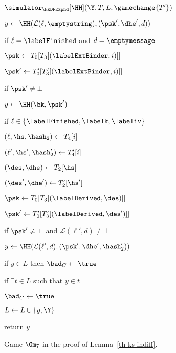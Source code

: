 \begin{figure}[tp]
\begin{minipage}[t]{0.49\textwidth}
\begin{oracle}{$\simulator_{\HKDFExpnd}[\HH](\Y, T, L, \gamechange{T'})$}
			\item \quad \quad $y \gets \HH(\mathcal{L} (\ell,\emptystring),(\psk', \dhe', d))$ 
			\item \quad \quad {}
			\item \quad \quad \quad {}
			\item
			\item if $\ell = \labelFinished$ and $d = \emptymessage$ 
			\item \quad $\psk \gets T_0[T_3[(\labelExtBinder, i)]]$
			\item \quad $\psk' \gets T'_0[T'_3[(\labelExtBinder, i)]]$
			\item \quad if $\psk' \neq \bot$ 
			\item \quad \quad $y \gets \HH(\bk, \psk')$
			\item \quad \quad {}
			\item \quad \quad \quad {}
			\item 
			\item if $\ell \in \{\labelFinished, \labelk, \labeliv \}$
			\item \quad $(\ell, \hs, \hash_2) \gets T_4[i]$
			\item \quad $(\ell', \hs', \hash'_2) \gets T'_4[i]$
			\item \quad $(\des, \dhe) \gets T_2[\hs]$
			\item \quad $(\des', \dhe') \gets T'_2[\hs']$
			\item \quad $\psk \gets T_0[T_3[(\labelDerived, \des)]]$
			\item \quad $\psk' \gets T'_0[T'_3[(\labelDerived, \des')]]$
			\item \quad if $\psk' \neq \bot$ and $\mathcal{L}(\ell', d) \neq \bot$ 
			\item \quad \quad $y \gets \HH(\mathcal{L} (\ell', d), (\psk', \dhe',\hash'_2))$
			\item \quad \quad {}
			\item \quad \quad \quad {}
			\item if $y \in L$ then $\bad_C \gets \true$
			\item if $\exists t \in L$ such that $y \in t$
			\item \quad $\bad_C \gets \true$
			\item $ L \gets L \cup \{y, \Y\}$
			\item return $y$
		\end{oracle}
	\end{minipage}
	\label{fig:gm7-ks-indiff}
	\caption{ Game $\Gm_7$ in the proof of Lemma~\ref{th-ks-indiff}.}
\end{figure}
